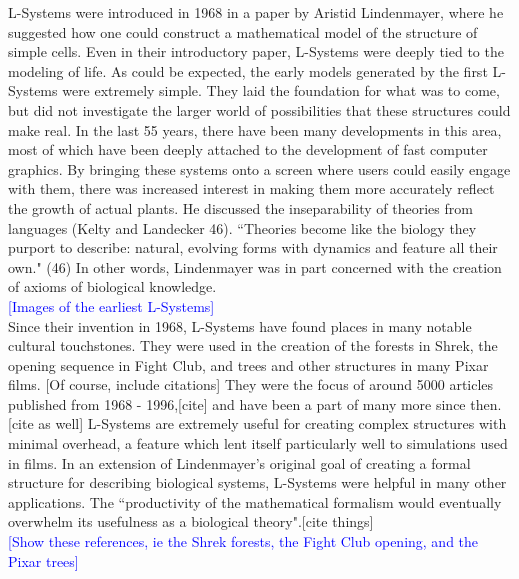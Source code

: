 \documentclass[12pt,twoside]{reedthesis}
\begin{document}
	L-Systems were introduced in 1968 in a paper by Aristid Lindenmayer, where he suggested how one could construct a mathematical model of the structure of simple cells. Even in their introductory paper, L-Systems were deeply tied to the modeling of life. As could be expected, the early models generated by the first L-Systems were extremely simple. They laid the foundation for what was to come, but did not investigate the larger world of possibilities that these structures could make real. In the last 55 years, there have been many developments in this area, most of which have been deeply attached to the development of fast computer graphics. By bringing these systems onto a screen where users could easily engage with them, there was increased interest in making them more accurately reflect the growth of actual plants. He discussed the inseparability of theories from languages (Kelty and Landecker 46). ``Theories become like the biology they purport to describe: natural, evolving forms with dynamics and feature all their own." (46) In other words, Lindenmayer was in part concerned with the creation of axioms of biological knowledge.\\
	
	\textcolor{blue}{[Images of the earliest L-Systems]}\\
	
	Since their invention in 1968, L-Systems have found places in many notable cultural touchstones. They were used in the creation of the forests in Shrek, the opening sequence in Fight Club, and trees and other structures in many Pixar films. [Of course, include citations] They were the focus of around 5000 articles published from 1968 - 1996,[cite] and have been a part of many more since then.[cite as well] L-Systems are extremely useful for creating complex structures with minimal overhead, a feature which lent itself particularly well to simulations used in films. In an extension of Lindenmayer's original goal of creating a formal structure for describing biological systems, L-Systems were helpful in many other applications. The ``productivity of the mathematical formalism would eventually overwhelm its usefulness as a biological theory".[cite things]\\
	
	\textcolor{blue}{[Show these references, ie the Shrek forests, the Fight Club opening, and the Pixar trees]}\\
	
	
\end{document}
